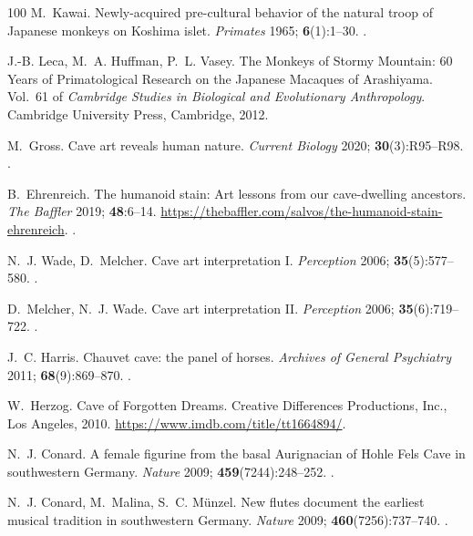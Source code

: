 \documentclass{ws-ijmpb}
\begin{document}
\begin{thebibliography}{100}
M.~Kawai. Newly-acquired pre-cultural behavior of the natural troop of
  {J}apanese monkeys on {K}oshima islet. \emph{Primates} 1965;
  \textbf{6}(1):1--30.
\newblock \href {http://doi.org/10.1007/bf01794457}
  {}.

J.-B. Leca, M.~A. Huffman, P.~L. Vasey. The Monkeys of Stormy Mountain: 60
  Years of Primatological Research on the Japanese Macaques of Arashiyama.
  Vol.~61 of \emph{Cambridge Studies in Biological and Evolutionary
  Anthropology}. Cambridge University Press, Cambridge, 2012.

M.~Gross. Cave art reveals human nature. \emph{Current Biology} 2020;
  \textbf{30}(3):R95--R98.
\newblock \href {http://doi.org/10.1016/j.cub.2020.01.042}
  {}.

B.~Ehrenreich. The humanoid stain: Art lessons from our cave-dwelling
  ancestors. \emph{The Baffler} 2019; \textbf{48}:6--14.
\newblock \url{https://thebaffler.com/salvos/the-humanoid-stain-ehrenreich}.
  \href {http://jstor.org/stable/26842273} {}.

N.~J. Wade, D.~Melcher. Cave art interpretation {I}. \emph{Perception} 2006;
  \textbf{35}(5):577--580.
\newblock \href {http://doi.org/10.1068/p3505ed} {}.

D.~Melcher, N.~J. Wade. Cave art interpretation {II}. \emph{Perception} 2006;
  \textbf{35}(6):719--722.
\newblock \href {http://doi.org/10.1068/p3506ed} {}.

J.~C. Harris. Chauvet cave: the panel of horses. \emph{Archives of General
  Psychiatry} 2011; \textbf{68}(9):869--870.
\newblock \href {http://doi.org/10.1001/archgenpsychiatry.2011.114}
  {}.

W.~Herzog. Cave of Forgotten Dreams. Creative Differences Productions, Inc.,
  Los Angeles, 2010.
\newblock \url{https://www.imdb.com/title/tt1664894/}.

N.~J. Conard. A female figurine from the basal {A}urignacian of {H}ohle {F}els
  {C}ave in southwestern {G}ermany. \emph{Nature} 2009;
  \textbf{459}(7244):248--252.
\newblock \href {http://doi.org/10.1038/nature07995}
  {}.

N.~J. Conard, M.~Malina, S.~C. M\"{u}nzel. New flutes document the earliest
  musical tradition in southwestern {G}ermany. \emph{Nature} 2009;
  \textbf{460}(7256):737--740.
\newblock \href {http://doi.org/10.1038/nature08169}
  {}.


\end{thebibliography}
\end{document}
